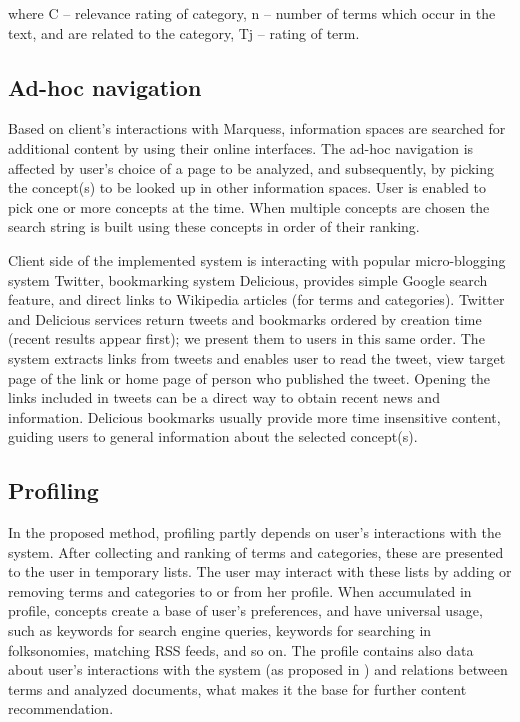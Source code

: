 \documentclass{llncs}%
\begin{document}
where C – relevance rating of category, n – number of terms which occur in the text, and are related to the category, Tj – rating of term.

\subsection{Ad-hoc navigation}

Based on client’s interactions with Marquess, information spaces are searched for additional content by using their online interfaces. The ad-hoc navigation is affected by user’s choice of a page to be analyzed, and subsequently, by picking the concept(s) to be looked up in other information spaces. User is enabled to pick one or more concepts at the time. When multiple concepts are chosen the search string is built using these concepts in order of their ranking. 
 
Client side of the implemented system is interacting with popular micro-blogging system Twitter, bookmarking system Delicious, provides simple Google search feature, and direct links to Wikipedia articles (for terms and categories). Twitter and Delicious services return tweets and bookmarks ordered by creation time (recent results appear first); we present them to users in this same order. The system extracts links from tweets and enables user to read the tweet, view target page of the link or home page of person who published the tweet. Opening the links included in tweets can be a direct way to obtain recent news and information. Delicious bookmarks usually provide more time insensitive content, guiding users to general information about the selected concept(s). 

\subsection{Profiling}

In the proposed method, profiling partly depends on user’s interactions with the system. After collecting and ranking of terms and categories, these are presented to the user in temporary lists. The user may interact with these lists by adding or removing terms and categories to or from her profile. When accumulated in profile, concepts create a base of user’s preferences, and have universal usage, such as keywords for search engine queries, keywords for searching in folksonomies, matching RSS feeds, and so on. The profile contains also data about user’s interactions with the system (as proposed in \cite{pazzani2007content}) and relations between terms and analyzed documents, what makes it the base for further content recommendation. 
\end{document}
